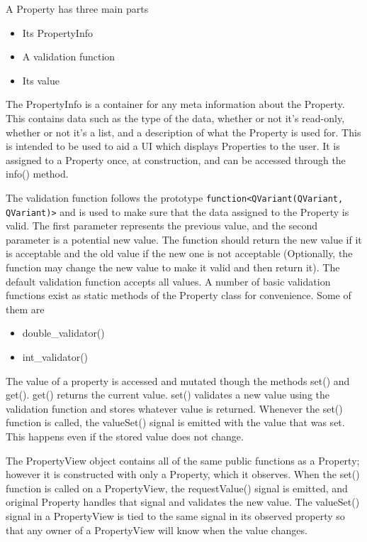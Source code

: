  	A Property has three main parts
 	\begin{itemize}
 		\item Its PropertyInfo
 		\item A validation function
 		\item Its value
 	\end{itemize}
 	
 	The PropertyInfo is a container for any meta information about the Property. This contains data such as the type of the data, whether or not it's read-only, whether or not it's a list, and a description of what the Property is used for. This is intended to be used to aid a UI which displays Properties to the user. It is assigned to a Property once, at construction, and can be accessed through the info() method.
 	
 	The validation function follows the prototype \lstinline|function<QVariant(QVariant, QVariant)>| and is used to make sure that the data assigned to the Property is valid. The first parameter represents the previous value, and the second parameter is a potential new value. The function should return the new value if it is acceptable and the old value if the new one is not acceptable (Optionally, the function may change the new value to make it valid and then return it). The default validation function accepts all values. A number of basic validation functions exist as static methods of the Property class for convenience. Some of them are
 	\begin{itemize}
 		\item double\_validator()
 		\item int\_validator()
 	\end{itemize}
 	
 	The value of a property is accessed and mutated though the methods set() and get(). get() returns the current value. set() validates a new value using the validation function and stores whatever value is returned. Whenever the set() function is called, the valueSet() signal is emitted with the value that was set. This happens even if the stored value does not change.
 	
 	The PropertyView object contains all of the same public functions as a Property; however it is constructed with only a Property, which it observes. When the set() function is called on a PropertyView, the requestValue() signal is emitted, and original Property handles that signal and validates the new value. The valueSet() signal in a PropertyView is tied to the same signal in its observed property so that any owner of a PropertyView will know when the value changes.
 	
